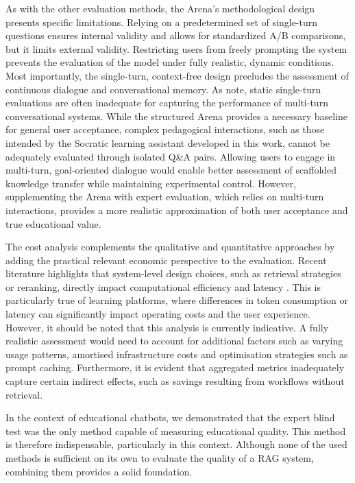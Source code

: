 As with the other evaluation methods, the Arena's methodological design presents specific limitations.
Relying on a predetermined set of single-turn questions ensures internal validity and allows for standardized A/B comparisons, but it limits external validity.
Restricting users from freely prompting the system prevents the evaluation of the model under fully realistic, dynamic conditions.
Most importantly, the single-turn, context-free design precludes the assessment of continuous dialogue and conversational memory.
As \autocite{Deriu2021} note, static single-turn evaluations are often inadequate for capturing the performance of multi-turn conversational systems.
While the structured Arena provides a necessary baseline for general user acceptance, complex pedagogical interactions, such as those intended by the Socratic learning assistant developed in this work, cannot be adequately evaluated through isolated Q\&A pairs.
Allowing users to engage in multi-turn, goal-oriented dialogue would enable better assessment of scaffolded knowledge transfer while maintaining experimental control. However, supplementing the Arena with expert evaluation, which relies on multi-turn interactions, provides a more realistic approximation of both user acceptance and true educational value.

The cost analysis complements the qualitative and quantitative approaches by adding the practical relevant economic perspective to the evaluation. Recent literature highlights that system-level design choices, such as retrieval strategies or reranking, directly impact computational efficiency and latency \autocite{liBPRAG,zhaoragSurvey}. This is particularly true of learning platforms, where differences in token consumption or latency can significantly impact operating costs and the user experience. However, it should be noted that this analysis is currently indicative. A fully realistic assessment would need to account for additional factors such as varying usage patterns, amortised infrastructure costs and optimisation strategies such as prompt caching. Furthermore, it is evident that aggregated metrics inadequately capture certain indirect effects, such as savings resulting from workflows without retrieval.

In the context of educational chatbots, we demonstrated that the expert blind test was the only method capable of measuring educational quality. This method is therefore indispensable, particularly in this context. Although none of the used methods is sufficient on its own to evaluate the quality of a RAG system, combining them provides a solid foundation.

